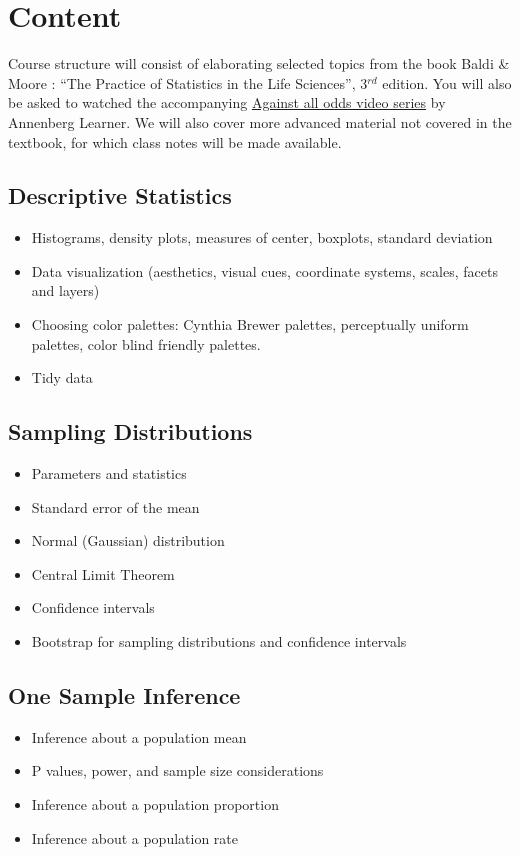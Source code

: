 \documentclass[]{article}
\begin{document}
\section{Content}
Course structure will consist of elaborating selected topics from the book Baldi \& Moore : ``The Practice of Statistics in the Life Sciences'', 3$^{rd}$ edition. You will also be asked to watched the accompanying \href{https://www.learner.org/courses/againstallodds/unitpages/index.html}{Against all odds video series} by Annenberg Learner. We will also cover more advanced material not covered in the textbook, for which class notes will be made available. 

\subsection{Descriptive Statistics}
\begin{itemize}
\item Histograms, density plots, measures of center, boxplots, standard deviation
\item Data visualization (aesthetics, visual cues, coordinate systems, scales, facets and layers)
\item Choosing color palettes: Cynthia Brewer palettes, perceptually uniform palettes, color blind friendly palettes. 
\item Tidy data
\end{itemize}

\subsection{Sampling Distributions}
\begin{itemize}
\item Parameters and statistics
\item Standard error of the mean
\item Normal (Gaussian) distribution
\item Central Limit Theorem
\item Confidence intervals
\item Bootstrap for sampling distributions and confidence intervals
\end{itemize}

\subsection{One Sample Inference}
\begin{itemize}
\item Inference about a population mean
\item P values, power, and sample size considerations
\item Inference about a population proportion
\item Inference about a population rate
\end{itemize}
\end{document}
